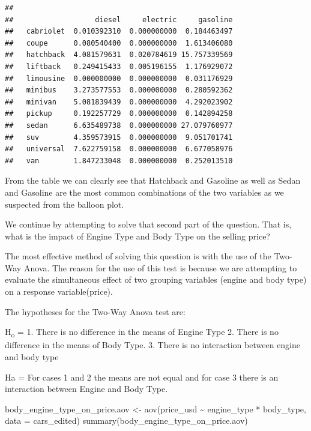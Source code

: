 \documentclass[
]{article}
\newenvironment{Shaded}{\begin{snugshade}}{\end{snugshade}}
\newcommand{\AttributeTok}[1]{\textcolor[rgb]{0.77,0.63,0.00}{#1}}
\newcommand{\FunctionTok}[1]{\textcolor[rgb]{0.00,0.00,0.00}{#1}}
\newcommand{\NormalTok}[1]{#1}
\newcommand{\OtherTok}[1]{\textcolor[rgb]{0.56,0.35,0.01}{#1}}
\newcommand{\SpecialCharTok}[1]{\textcolor[rgb]{0.00,0.00,0.00}{#1}}
\begin{document}
\begin{verbatim}
##            
##                   diesel     electric     gasoline
##   cabriolet  0.010392310  0.000000000  0.184463497
##   coupe      0.080540400  0.000000000  1.613406080
##   hatchback  4.081579631  0.020784619 15.757339569
##   liftback   0.249415433  0.005196155  1.176929072
##   limousine  0.000000000  0.000000000  0.031176929
##   minibus    3.273577553  0.000000000  0.280592362
##   minivan    5.081839439  0.000000000  4.292023902
##   pickup     0.192257729  0.000000000  0.142894258
##   sedan      6.635489738  0.000000000 27.079760977
##   suv        4.359573915  0.000000000  9.051701741
##   universal  7.622759158  0.000000000  6.677058976
##   van        1.847233048  0.000000000  0.252013510
\end{verbatim}

From the table we can clearly see that Hatchback and Gasoline as well as
Sedan and Gasoline are the most common combinations of the two variables
as we suspected from the balloon plot.

We continue by attempting to solve that second part of the question.
That is, what is the impact of Engine Type and Body Type on the selling
price?

The most effective method of solving this question is with the use of
the Two-Way Anova. The reason for the use of this test is because we are
attempting to evaluate the simultaneous effect of two grouping variables
(engine and body type) on a response variable(price).

The hypotheses for the Two-Way Anova test are:

H\textsubscript{o} = 1. There is no difference in the means of Engine
Type 2. There is no difference in the means of Body Type. 3. There is no
interaction between engine and body type

Ha = For cases 1 and 2 the means are not equal and for case 3 there is
an interaction between Engine and Body Type.

\begin{Shaded}
\begin{Highlighting}[]
\NormalTok{body\_engine\_type\_on\_price.aov }\OtherTok{\textless{}{-}} \FunctionTok{aov}\NormalTok{(price\_usd }\SpecialCharTok{\textasciitilde{}}\NormalTok{ engine\_type }\SpecialCharTok{*}\NormalTok{ body\_type, }\AttributeTok{data =}\NormalTok{ cars\_edited)}
\FunctionTok{summary}\NormalTok{(body\_engine\_type\_on\_price.aov)}
\end{Highlighting}
\end{Shaded}
\end{document}
